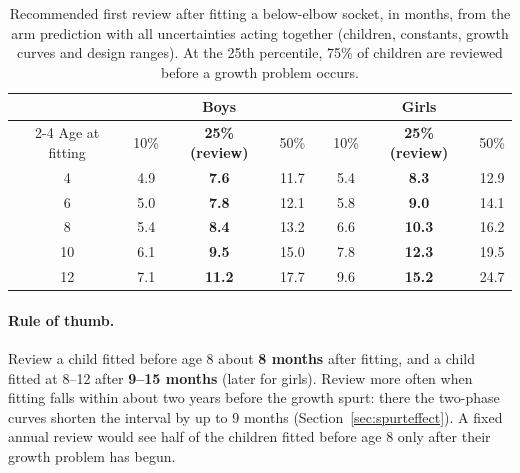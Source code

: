 \documentclass[11pt]{article}
\theoremstyle{definition}
\begin{document}
\begin{table}[htbp]
\centering\small
\caption{Recommended first review after fitting a below-elbow socket, in months, from the arm prediction with all uncertainties acting together (children, constants, growth curves and design ranges). At the 25th percentile, 75\% of children are reviewed before a growth problem occurs.}
\label{tab:schedule}
\begin{tabular}{@{}c ccc c ccc@{}}
\toprule
& \multicolumn{3}{c}{Boys} && \multicolumn{3}{c}{Girls}\\
\cmidrule{2-4}\cmidrule{6-8}
Age at fitting & 10\% & \textbf{25\% (review)} & 50\% && 10\% & \textbf{25\% (review)} & 50\%\\
\midrule
4  & 4.9 & \textbf{7.6}  & 11.7 && 5.4 & \textbf{8.3}  & 12.9\\
6  & 5.0 & \textbf{7.8}  & 12.1 && 5.8 & \textbf{9.0}  & 14.1\\
8  & 5.4 & \textbf{8.4}  & 13.2 && 6.6 & \textbf{10.3} & 16.2\\
10 & 6.1 & \textbf{9.5}  & 15.0 && 7.8 & \textbf{12.3} & 19.5\\
12 & 7.1 & \textbf{11.2} & 17.7 && 9.6 & \textbf{15.2} & 24.7\\
\bottomrule
\end{tabular}
\end{table}

\paragraph{Rule of thumb.} Review a child fitted before age 8 about \textbf{8 months} after fitting, and a child fitted at 8--12 after \textbf{9--15 months} (later for girls). Review more often when fitting falls within about two years before the growth spurt: there the two-phase curves shorten the interval by up to 9 months (Section~\ref{sec:spurteffect}). A fixed annual review would see half of the children fitted before age 8 only after their growth problem has begun.
\end{document}
